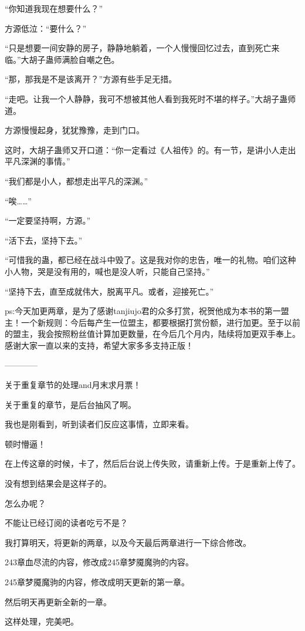 \begin{this_body}
“你知道我现在想要什么？”

方源低泣：“要什么？”

“只是想要一间安静的房子，静静地躺着，一个人慢慢回忆过去，直到死亡来临。”大胡子蛊师满脸自嘲之色。

“那，那我是不是该离开？”方源有些手足无措。

“走吧。让我一个人静静，我可不想被其他人看到我死时不堪的样子。”大胡子蛊师道。

方源慢慢起身，犹犹豫豫，走到门口。

这时，大胡子蛊师又开口道：“你一定看过《人祖传》的。有一节，是讲小人走出平凡深渊的事情。”

“我们都是小人，都想走出平凡的深渊。”

“唉……”

“一定要坚持啊，方源。”

“活下去，坚持下去。”

“可惜我的蛊，都已经在战斗中毁了。这是我对你的忠告，唯一的礼物。咱们这种小人物，哭是没有用的，喊也是没人听，只能自己坚持。”

“坚持下去，直至成就伟大，脱离平凡。或者，迎接死亡。”

ps:今天加更两章，是为了感谢tanjiujo君的众多打赏，祝贺他成为本书的第一盟主！一个新规则：今后每产生一位盟主，都要根据打赏份额，进行加更。至于以前的盟主，我会按照粉丝值计算加更数量，在今后几个月内，陆续将加更双手奉上。感谢大家一直以来的支持，希望大家多多支持正版！

------------

关于重复章节的处理and月末求月票！

关于重复的章节，是后台抽风了啊。

我也是刚看到，听到读者们反应这事情，立即来看。

顿时懵逼！

在上传这章的时候，卡了，然后后台说上传失败，请重新上传。于是重新上传了。

没有想到结果会是这样子的。

怎么办呢？

不能让已经订阅的读者吃亏不是？

我打算明天，将更新的两章，以及今天最后两章进行一下综合修改。

243章血尽流的内容，修改成245章梦魇魔驹的内容。

245章梦魇魔驹的内容，修改成明天更新的第一章。

然后明天再更新全新的一章。

这样处理，完美吧。


\end{this_body}
